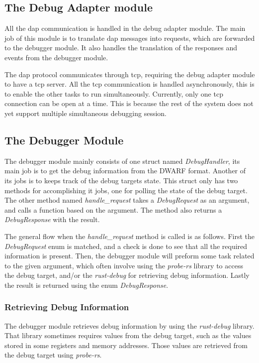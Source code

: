 \subsection{The Debug Adapter module}

All the \gls{dap} communication is handled in the debug adapter module.
The main job of this module is to translate \gls{dap} messages into requests, which are forwarded to the debugger module.
It also handles the translation of the responses and events from the debugger module.


The \gls{dap} protocol communicates through \gls{tcp}, requiring the debug adapter module to have a \gls{tcp} server.
All the \gls{tcp} communication is handled asynchronously, this is to enable the other tasks to run simultaneously.
Currently, only one \gls{tcp} connection can be open at a time.
This is because the rest of the system does not yet support multiple simultaneous debugging session.



\subsection{The Debugger Module}
The debugger module mainly consists of one struct named \emph{DebugHandler}, its main job is to get the debug information from the \gls{DWARF} format.
Another of its jobs is to keeps track of the debug targets state.
This struct only has two methods for accomplishing it jobs, one for polling the state of the debug target.
The other method named \emph{handle\_request} takes a \emph{DebugRequest} as an argument, and calls a function based on the argument.
The method also returns a \emph{DebugResponse} with the result.


The general flow when the \emph{handle\_request} method is called is as follows.
First the \emph{DebugRequest} enum is matched, and a check is done to see that all the required information is present.
Then, the debugger module will preform some task related to the given argument, which often involve using the \emph{probe-rs} library to access the debug target, and/or the \emph{rust-debug} for retrieving debug information.
Lastly the result is returned using the enum \emph{DebugResponse}.



\subsubsection{Retrieving Debug Information}
The debugger module retrieves debug information by using the \emph{rust-debug} library.
That library sometimes requires values from the debug target, such as the values stored in some registers and memory addresses.
Those values are retrieved from the debug target using \emph{probe-rs}.



